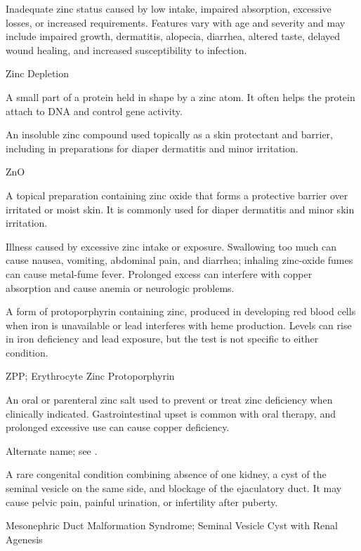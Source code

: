  Inadequate zinc status caused by low intake, impaired absorption, excessive losses, or increased requirements. Features vary with age and severity and may include impaired growth, dermatitis, alopecia, diarrhea, altered taste, delayed wound healing, and increased susceptibility to infection.

\synonyms
Zinc Depletion

 A small part of a protein held in shape by a zinc atom. It often helps the protein attach to DNA and control gene activity.

 An insoluble zinc compound used topically as a skin protectant and barrier, including in preparations for diaper dermatitis and minor irritation.

\synonyms
ZnO

 A topical preparation containing zinc oxide that forms a protective barrier over irritated or moist skin. It is commonly used for diaper dermatitis and minor skin irritation.

 Illness caused by excessive zinc intake or exposure. Swallowing too much can cause nausea, vomiting, abdominal pain, and diarrhea; inhaling zinc-oxide fumes can cause metal-fume fever. Prolonged excess can interfere with copper absorption and cause anemia or neurologic problems.

 A form of protoporphyrin containing zinc, produced in developing red blood cells when iron is unavailable or lead interferes with heme production. Levels can rise in iron deficiency and lead exposure, but the test is not specific to either condition.

\synonyms
ZPP; Erythrocyte Zinc Protoporphyrin

 An oral or parenteral zinc salt used to prevent or treat zinc deficiency when clinically indicated. Gastrointestinal upset is common with oral therapy, and prolonged excessive use can cause copper deficiency.

 Alternate name; see .

 A rare congenital condition combining absence of one kidney, a cyst of the seminal vesicle on the same side, and blockage of the ejaculatory duct. It may cause pelvic pain, painful urination, or infertility after puberty.

\synonyms
Mesonephric Duct Malformation Syndrome; Seminal Vesicle Cyst with Renal Agenesis

